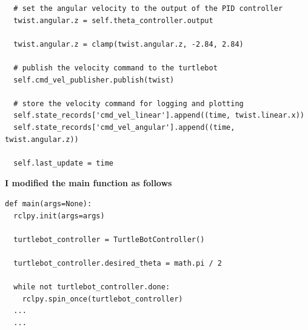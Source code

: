 \documentclass{article}
\begin{document}
\begin{verbatim}
  # set the angular velocity to the output of the PID controller
  twist.angular.z = self.theta_controller.output

  twist.angular.z = clamp(twist.angular.z, -2.84, 2.84)

  # publish the velocity command to the turtlebot
  self.cmd_vel_publisher.publish(twist)

  # store the velocity command for logging and plotting
  self.state_records['cmd_vel_linear'].append((time, twist.linear.x))
  self.state_records['cmd_vel_angular'].append((time, twist.angular.z))

  self.last_update = time
\end{verbatim}

\noindent \textbf{I modified the main function as follows}

\begin{verbatim}
def main(args=None):
  rclpy.init(args=args)

  turtlebot_controller = TurtleBotController()

  turtlebot_controller.desired_theta = math.pi / 2

  while not turtlebot_controller.done:
    rclpy.spin_once(turtlebot_controller)
  ...
  ...
\end{verbatim}
\end{document}
